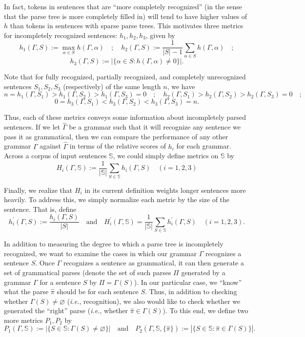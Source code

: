 \documentclass[paper=a4, fontsize=11pt]{scrartcl} %
\begin{document}
In fact, tokens in sentences that are ``more completely recognized'' (in the sense that the parse tree is more completely filled in) will tend to have higher values of $h$ than tokens in sentences with sparse parse trees.  This motivates three metrics for incompletely recognized sentences: $h_1, h_2, h_3$, given by $$ h_1(\Gamma,S) := \max_{\alpha \in S} h(\Gamma,\alpha) \quad ; \quad h_2(\Gamma,S) := \frac{1}{|S| - 1}\sum_{\alpha \in S} h(\Gamma,\alpha) \quad ;$$ $$  h_3(\Gamma,S) := \left| \{ \alpha \in S : h(\Gamma,\alpha) \neq 0 \} \right|. $$

Note that for fully recognized, partially recognized, and completely unrecognized sentences $S_1, S_2, S_3$ (respectively) of the same length $n$, we have $$ n = h_1(\Gamma,S_1) > h_1(\Gamma,S_2) > h_1(\Gamma,S_3) = 0 \quad;\quad h_2(\Gamma,S_1) > h_2(\Gamma,S_2) > h_2(\Gamma,S_3) = 0 \quad;$$ $$ 0 = h_3(\Gamma,S_1) < h_3(\Gamma,S_2) < h_3(\Gamma,S_3) = n .$$

Thus, each of these metrics conveys some information about incompletely parsed sentences.  If we let $\hat{\Gamma}$ be a grammar such that it will recognize any sentence we pass it as grammatical, then we can compare the performance of any other grammar $\Gamma$ against $\hat{\Gamma}$ in terms of the relative scores of $h_i$ for each grammar.  Across a corpus of input sentences $\mathbb{S}$, we could simply define metrics on $\mathbb{S}$ by $$ H_i(\Gamma,\mathbb{S}) := \frac{1}{|\mathbb{S}|} \sum_{S \in \mathbb{S}} h_i(\Gamma,S) \quad (i = 1,2,3) $$

Finally, we realize that $H_i$ in its current definition weights longer sentences more heavily.  To address this, we simply normalize each metric by the size of the sentence.  That is, define $$ h_i^\prime(\Gamma,S) := \frac{h_i(\Gamma,S)}{|S|} \quad\mbox{and}\quad H_i^\prime(\Gamma,\mathbb{S}) = \frac{1}{|\mathbb{S}|}\sum_{S \in \mathbb{S}} h_i^\prime(\Gamma,S) \quad (i = 1,2,3). $$

In addition to measuring the degree to which a parse tree is incompletely recognized, we want to examine the cases in which our grammar $\Gamma$ recognizes a sentence $S$.  Once $\Gamma$ recognizes a sentence as grammatical, it can then generate a set of grammatical parses (denote the set of such parses $\Pi$ generated by a grammar $\Gamma$ for a sentence $S$ by $\Pi = \Gamma(S)$).  In our particular case, we ``know'' what the parse $\hat{\pi}$ should be for each sentence $S$.  Thus, in addition to checking whether $\Gamma(S) \neq \varnothing$ (\textit{i.e.}, recognition), we also would like to check whether we generated the ``right'' parse (\textit{i.e.}, whether $\hat{\pi} \in \Gamma(S)$).  To this end, we define two more metrics $P_1, P_2$ by $$ P_1(\Gamma, \mathbb{S}) := \left| \{ S \in \mathbb{S} : \Gamma(S) \neq \varnothing \} \right| \quad\mbox{and}\quad P_2(\Gamma, \mathbb{S}, \{ \hat{\pi} \}) := \left| \{ S \in \mathbb{S} : \hat{\pi} \in \Gamma(S) \} \right|. $$
\end{document}
